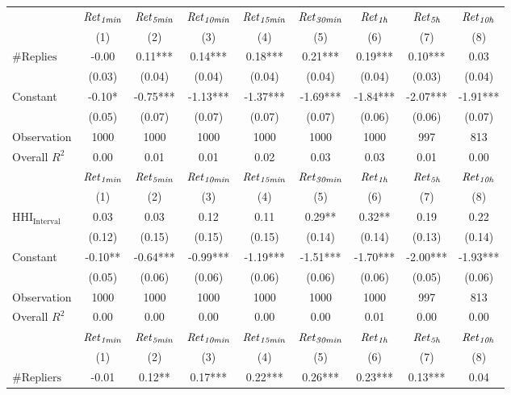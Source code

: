 \begin{tabular}{lcccccccc}
\hline
 & ${\it Ret}_{\it 1min}$ & ${\it Ret}_{\it 5min}$ & ${\it Ret}_{\it 10min}$ & ${\it Ret}_{\it 15min}$ & ${\it Ret}_{\it 30min}$ & ${\it Ret}_{\it 1h}$ & ${\it Ret}_{\it 5h}$ & ${\it Ret}_{\it 10h}$ \\
 & (1) & (2) & (3) & (4) & (5) & (6) & (7) & (8) \\
\hline
$\#\text{Replies}$ & -0.00 & 0.11*** & 0.14*** & 0.18*** & 0.21*** & 0.19*** & 0.10*** & 0.03 \\
 & (0.03) & (0.04) & (0.04) & (0.04) & (0.04) & (0.04) & (0.03) & (0.04) \\
Constant & -0.10* & -0.75*** & -1.13*** & -1.37*** & -1.69*** & -1.84*** & -2.07*** & -1.91*** \\
 & (0.05) & (0.07) & (0.07) & (0.07) & (0.07) & (0.06) & (0.06) & (0.07) \\
Observation & 1000 & 1000 & 1000 & 1000 & 1000 & 1000 & 997 & 813 \\
Overall $R^2$ & 0.00 & 0.01 & 0.01 & 0.02 & 0.03 & 0.03 & 0.01 & 0.00 \\
\hline
 & ${\it Ret}_{\it 1min}$ & ${\it Ret}_{\it 5min}$ & ${\it Ret}_{\it 10min}$ & ${\it Ret}_{\it 15min}$ & ${\it Ret}_{\it 30min}$ & ${\it Ret}_{\it 1h}$ & ${\it Ret}_{\it 5h}$ & ${\it Ret}_{\it 10h}$ \\
 & (1) & (2) & (3) & (4) & (5) & (6) & (7) & (8) \\
\hline
$\text{HHI}_{\text{Interval}}$ & 0.03 & 0.03 & 0.12 & 0.11 & 0.29** & 0.32** & 0.19 & 0.22 \\
 & (0.12) & (0.15) & (0.15) & (0.15) & (0.14) & (0.14) & (0.13) & (0.14) \\
Constant & -0.10** & -0.64*** & -0.99*** & -1.19*** & -1.51*** & -1.70*** & -2.00*** & -1.93*** \\
 & (0.05) & (0.06) & (0.06) & (0.06) & (0.06) & (0.06) & (0.05) & (0.06) \\
Observation & 1000 & 1000 & 1000 & 1000 & 1000 & 1000 & 997 & 813 \\
Overall $R^2$ & 0.00 & 0.00 & 0.00 & 0.00 & 0.00 & 0.01 & 0.00 & 0.00 \\
\hline
 & ${\it Ret}_{\it 1min}$ & ${\it Ret}_{\it 5min}$ & ${\it Ret}_{\it 10min}$ & ${\it Ret}_{\it 15min}$ & ${\it Ret}_{\it 30min}$ & ${\it Ret}_{\it 1h}$ & ${\it Ret}_{\it 5h}$ & ${\it Ret}_{\it 10h}$ \\
 & (1) & (2) & (3) & (4) & (5) & (6) & (7) & (8) \\
\hline
$\#\text{Repliers}$ & -0.01 & 0.12** & 0.17*** & 0.22*** & 0.26*** & 0.23*** & 0.13*** & 0.04 \\

\end{tabular}
